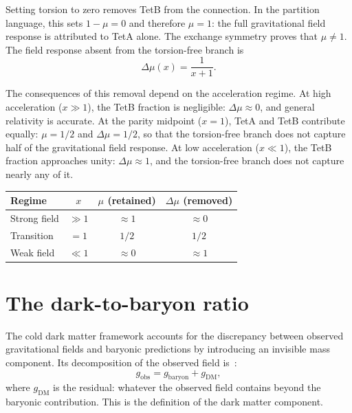 \documentclass[twocolumn]{iopjournal}
\begin{document}
Setting torsion to zero removes TetB from the connection. In the
partition language, this sets $1 - \mu = 0$ and therefore
$\mu = 1$: the full gravitational field response is attributed to
TetA alone. The exchange symmetry proves that $\mu \neq 1$. The
field response absent from the torsion-free branch is
\begin{equation}
  \Delta\mu(x) = \frac{1}{x + 1}.
  \label{eq:delta_mu}
\end{equation}

The consequences of this removal depend on the acceleration
regime. At high acceleration ($x \gg 1$), the TetB fraction is
negligible: $\Delta\mu \approx 0$, and general relativity is
accurate. At the parity midpoint ($x = 1$), TetA and TetB
contribute equally: $\mu = 1/2$ and $\Delta\mu = 1/2$, so that
the torsion-free branch does not capture half of the gravitational
field response. At low acceleration ($x \ll 1$), the TetB fraction
approaches unity: $\Delta\mu \approx 1$, and the torsion-free
branch does not capture nearly any of it.

\medskip
\begin{center}
\begin{tabular}{lccc}
\hline
Regime & $x$ & $\mu$ (retained) & $\Delta\mu$ (removed) \\
\hline
Strong field  & $\gg 1$ & $\approx 1$ & $\approx 0$ \\
Transition    & $= 1$   & $1/2$       & $1/2$ \\
Weak field    & $\ll 1$ & $\approx 0$ & $\approx 1$ \\
\hline
\end{tabular}
\end{center}


\section{The dark-to-baryon ratio}

The cold dark matter framework accounts for the discrepancy
between observed gravitational fields and baryonic predictions
by introducing an invisible mass component. Its decomposition of
the observed field is~\cite{NFW1996}:
\begin{equation}
  g_{\mathrm{obs}} = g_{\mathrm{baryon}} + g_{\mathrm{DM}},
  \label{eq:cdm_decomp}
\end{equation}
where $g_{\mathrm{DM}}$ is the residual: whatever the
observed field contains beyond the baryonic contribution. This
is the definition of the dark matter component.
\end{document}
